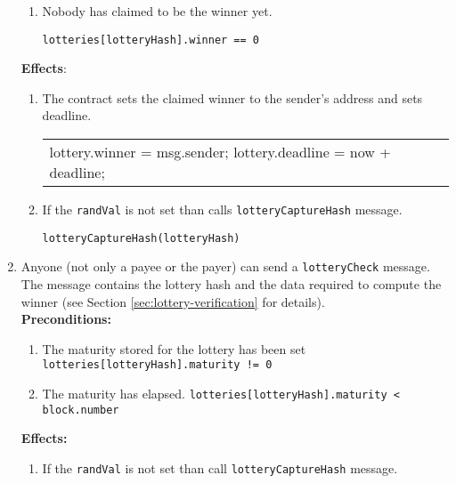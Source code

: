 \documentclass[a4paper]{article}
\begin{document}
\begin{enumerate}
\begin{enumerate}
                \item Nobody has claimed to be the winner yet.
                    \begin{center}
                        \texttt{lotteries[lotteryHash].winner == 0}
                    \end{center}
            \end{enumerate}
            \textbf{Effects}:
            \begin{enumerate}
                \item The contract sets the claimed winner to the sender's address and sets deadline.
                    \begin{center}
                        \begin{tabular}{l}
                		    lottery.winner = msg.sender;
                            lottery.deadline = now + deadline;
                        \end{tabular}
                    \end{center}
                \item If the \texttt{randVal} is not set than calls \texttt{lotteryCaptureHash} message.
                    \begin{center}
                        \texttt{lotteryCaptureHash(lotteryHash)}
                    \end{center}
            \end{enumerate}
        \item Anyone (not only a payee or the payer) can send a \texttt{lotteryCheck} message. The message contains
            the lottery hash and the data required to compute the winner (see Section \ref{sec:lottery-verification}
            for details).\\
            \textbf{Preconditions:}
            \begin{enumerate}
                \item The maturity stored for the lottery has been set
                    \texttt{lotteries[lotteryHash].maturity != 0}
                \item The maturity has elapsed.
	                \texttt{lotteries[lotteryHash].maturity < block.number}
	        \end{enumerate}
	        \textbf{Effects:}
	        \begin{enumerate}
                \item If the \texttt{randVal} is not set than call \texttt{lotteryCaptureHash} message.
                    \begin{center}

\end{center}
\end{enumerate}
\end{enumerate}
\end{document}
